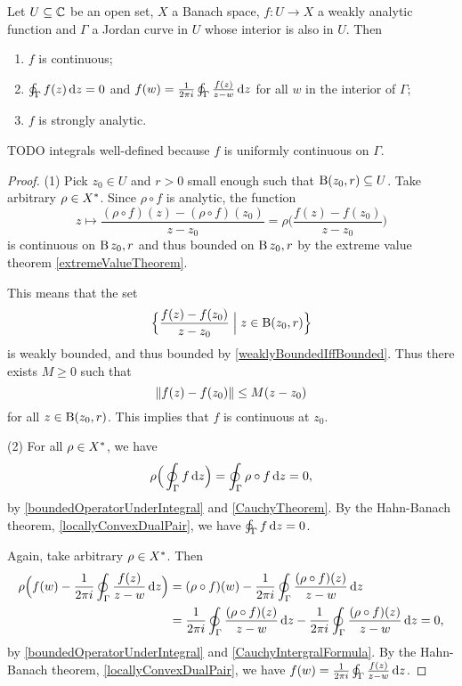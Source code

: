 \begin{proposition} \label{weakAnalyticityConsequences}
Let $U\subseteq \mathbb{C}$ be an open set, $X$ a Banach space, $f: U\to X$ a weakly analytic function and $\Gamma$ a Jordan curve in $U$ whose interior is also in $U$. Then
\begin{enumerate}
\item $f$ is continuous;
\item $\oint_{\Gamma}f(z)\operatorname{d \!}{z} = 0$ and $f(w) = \frac{1}{2\pi i}\oint_{\Gamma}\frac{f(z)}{z-w}\operatorname{d \!}{z}$ for all $w$ in the interior of $\Gamma$;
\item $f$ is strongly analytic.
\end{enumerate}
\end{proposition}
TODO integrals well-defined because $f$ is uniformly continuous on $\Gamma$.
\begin{proof}
(1) Pick $z_0\in U$ and $r>0$ small enough such that $\operatorname{B}(z_0, r)\subseteq U$. Take arbitrary $\rho\in{X}^*$. Since $\rho\circ f$ is analytic, the function
\[ z\mapsto \frac{(\rho\circ f)(z) - (\rho\circ f)(z_0)}{z-z_0} = \rho\Big(\frac{f(z) - f(z_0)}{z-z_0}\Big) \]
is continuous on $\operatorname{B}{z_0, r}$ and thus bounded on $\operatorname{B}{z_0, r}$ by the extreme value theorem \ref{extremeValueTheorem}. 

This means that the set
\[ \setbuilder[\Big]{\frac{f(z) - f(z_0)}{z-z_0}}{z\in\ball(z_0, r)} \]
is weakly bounded, and thus bounded by \ref{weaklyBoundedIffBounded}. Thus there exists $M \geq 0$ such that
\[ \lVert f(z) - f(z_0)\rVert \leq M(z-z_0) \]
for all $z\in\operatorname{B}(z_0,r)$. This implies that $f$ is continuous at $z_0$.

(2) For all $\rho\in{X}^*$, we have
\[ \rho\Big(\oint_{\Gamma}f\operatorname{d \!}{z}\Big) = \oint_\Gamma \rho\circ f \operatorname{d \!}{z} = 0, \]
by \ref{boundedOperatorUnderIntegral} and \ref{CauchyTheorem}. By the Hahn-Banach theorem, \ref{locallyConvexDualPair}, we have $\oint_{\Gamma}f\operatorname{d \!}{z} = 0$.

Again, take arbitrary $\rho\in{X}^*$. Then
\begin{align*}
\rho\Big(f(w) - \frac{1}{2\pi i}\oint_{\Gamma}\frac{f(z)}{z-w}\operatorname{d \!}{z}\Big) &= (\rho\circ f)(w) - \frac{1}{2\pi i}\oint_{\Gamma}\frac{(\rho \circ f)(z)}{z-w}\operatorname{d \!}{z} \\
&= \frac{1}{2\pi i}\oint_{\Gamma}\frac{(\rho \circ f)(z)}{z-w}\operatorname{d \!}{z} - \frac{1}{2\pi i}\oint_{\Gamma}\frac{(\rho \circ f)(z)}{z-w}\operatorname{d \!}{z} = 0,
\end{align*}
by \ref{boundedOperatorUnderIntegral} and \ref{CauchyIntergralFormula}. By the Hahn-Banach theorem, \ref{locallyConvexDualPair}, we have $f(w) = \frac{1}{2\pi i}\oint_{\Gamma}\frac{f(z)}{z-w}\operatorname{d \!}{z}$.


\end{proof}
